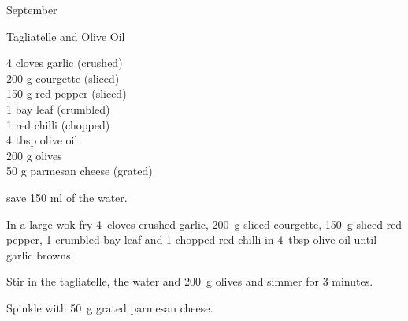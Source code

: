 \begin{menu}{September}
    \begin{recipe}{1}{Tagliatelle and Olive Oil}%
		\begin{ingredients}
		4 cloves garlic (crushed) \\
	200 g courgette (sliced) \\
	150 g red pepper (sliced) \\
	1  bay leaf (crumbled) \\
	1  red chilli (chopped) \\
	4 tbsp olive oil  \\
	200 g olives  \\
	50 g parmesan cheese (grated) \\
	
		\end{ingredients}
	
	
    \begin{instructions}
    \item 
        save 150 ml of the water.
      \item 
        In a large wok fry
        4~cloves crushed garlic,
        200~g sliced courgette,
        150~g sliced red pepper,
        1 crumbled bay leaf
        and
        1 chopped red chilli
        in
        4~tbsp  olive oil
        until garlic browns.
      \item 
        Stir in the tagliatelle,
        the water
        and
        200~g  olives
        and simmer for 3 minutes.
      \item 
        Spinkle with
        50~g grated parmesan cheese.
      
    \end{instructions}
    \end{recipe}%
  
    \clearpage
    \end{menu}
	
